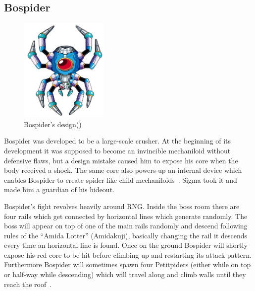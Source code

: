 \subsection{Bospider}\label{boss:bospider}
\begin{figure}[htp]
	\centering
	\includegraphics[height=5cm]{figures/X1/Sigma_stages/Bospider.jpg}
	\caption{Bospider's design(\cite{book:MMX_Complete_art})}
\end{figure}
Bospider was developed to be a large-scale crusher. At the beginning of its development it was supposed to become an invincible mechaniloid without defensive flaws, but a design mistake caused him to expose his core when the body received a shock. The same core also powers-up an internal device which enables Bospider to create spider-like child mechaniloids~\cite{wayback:X_resources}. Sigma took it and made him a guardian of his hideout.

Bospider's fight revolves heavily around RNG. Inside the boss room there are four rails which get connected by horizontal lines which generate randomly. The boss will appear on top of one of the main rails randomly and descend following rules of the ``Amida Lotter'' (Amidakuji), basically changing the rail it descends every time an horizontal line is found. Once on the ground Bospider will shortly expose his red core to be hit before climbing up and restarting its attack pattern. Furthermore Bospider will sometimes spawn four Petitpiders (either while on top or half-way while descending) which will travel along and climb walls until they reach the roof~\cite{wiki:Bospider}.

